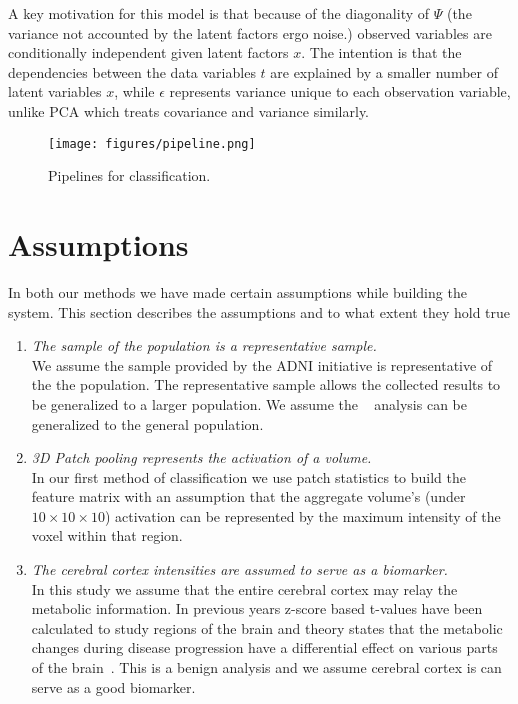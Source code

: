 A key motivation for this model is that because of the diagonality of $ \Psi $ (the variance not accounted by the latent factors ergo noise.) observed variables are conditionally independent given latent factors $ x $. The intention is that the dependencies between the data variables $t$ are explained by a smaller number of latent variables $x$, while $ \epsilon $ 
represents variance unique to
each observation variable, unlike PCA which treats covariance and variance similarly. 


\begin{figure}[h]
	\centering
	\texttt{[image: figures/pipeline.png]}
	\caption{Pipelines for classification.}
	\label{fig:pipeline}
\end{figure}

\section{Assumptions}
In both our methods we have made certain assumptions while building the system. This section describes the assumptions and to what extent they hold true 
\begin{enumerate}
\item \textit{The sample of the population is a representative sample.}\\
We assume the sample provided by the ADNI initiative is representative of the the population. The representative sample allows the collected results to be generalized to a larger population. We assume the \FDGPET~ analysis can be generalized to the general population.
\item \textit{3D Patch pooling represents the activation of a volume.}\\
In our first method of classification we use patch statistics to build the feature matrix with an assumption that the aggregate volume's (under $ 10\times10\times10 $) activation can be represented by the maximum intensity of the voxel within that region.   
\item \textit{The cerebral cortex intensities are assumed to serve as a biomarker.}\\
In this study we assume that the entire cerebral cortex may relay the metabolic information. In previous years z-score based t-values have been calculated to study regions of the brain and theory states that the metabolic changes during disease progression have a differential effect on various parts of the brain~\citep{ishii2014pet}. This is a benign analysis and we assume cerebral cortex is can serve as a good biomarker. 
\end{enumerate}
